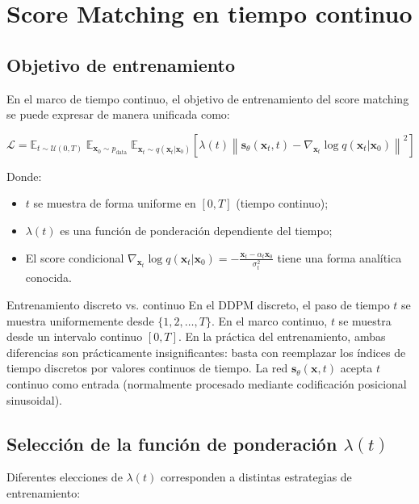 \section{Score Matching en tiempo continuo}

\subsection{Objetivo de entrenamiento}

En el marco de tiempo continuo, el objetivo de entrenamiento del score matching se puede expresar de manera unificada como:

$$
\mathcal{L} = \mathbb{E}_{t \sim \mathcal{U}(0,T)}\;\mathbb{E}_{\mathbf{x}_0 \sim p_{\text{data}}}\;\mathbb{E}_{\mathbf{x}_t \sim q(\mathbf{x}_t|\mathbf{x}_0)}\left[\lambda(t)\left\|\mathbf{s}_\theta(\mathbf{x}_t, t) - \nabla_{\mathbf{x}_t}\log q(\mathbf{x}_t|\mathbf{x}_0)\right\|^2\right]
$$

Donde:
\begin{itemize}
    \item $t$ se muestra de forma uniforme en $[0, T]$ (tiempo continuo);
    \item $\lambda(t)$ es una función de ponderación dependiente del tiempo;
    \item El score condicional $\nabla_{\mathbf{x}_t}\log q(\mathbf{x}_t|\mathbf{x}_0) = -\frac{\mathbf{x}_t - \alpha_t \mathbf{x}_0}{\sigma_t^2}$ tiene una forma analítica conocida.
\end{itemize}

\begin{importantbox}{Entrenamiento discreto vs. continuo}
En el DDPM discreto, el paso de tiempo $t$ se muestra uniformemente desde $\{1, 2, \ldots, T\}$. En el marco continuo, $t$ se muestra desde un intervalo continuo $[0, T]$. En la práctica del entrenamiento, ambas diferencias son prácticamente insignificantes: basta con reemplazar los índices de tiempo discretos por valores continuos de tiempo. La red $\mathbf{s}_\theta(\mathbf{x}, t)$ acepta $t$ continuo como entrada (normalmente procesado mediante codificación posicional sinusoidal).
\end{importantbox}

\subsection{Selección de la función de ponderación $\lambda(t)$}

Diferentes elecciones de $\lambda(t)$ corresponden a distintas estrategias de entrenamiento:

